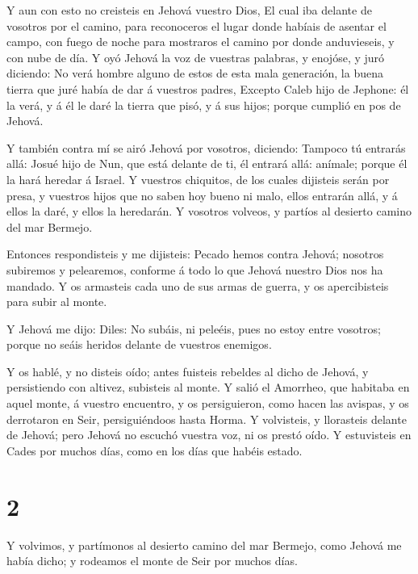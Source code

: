  Y aun con esto no creisteis en Jehová vuestro Dios,
 El cual iba delante de vosotros por el camino, para
reconoceros el lugar donde habíais de asentar el campo, con fuego de
noche para mostraros el camino por donde anduvieseis, y con nube de día.
 Y oyó Jehová la voz de vuestras palabras, y enojóse, y
juró diciendo:  No verá hombre alguno de estos de esta mala
generación, la buena tierra que juré había de dar á vuestros padres,
 Excepto Caleb hijo de Jephone: él la verá, y á él le daré
la tierra que pisó, y á sus hijos; porque cumplió en pos de Jehová.

 Y también contra mí se airó Jehová por vosotros, diciendo:
Tampoco tú entrarás allá:  Josué hijo de Nun, que está
delante de ti, él entrará allá: anímale; porque él la hará heredar á
Israel.  Y vuestros chiquitos, de los cuales dijisteis
serán por presa, y vuestros hijos que no saben hoy bueno ni malo, ellos
entrarán allá, y á ellos la daré, y ellos la heredarán.  Y
vosotros volveos, y partíos al desierto camino del mar Bermejo.

 Entonces respondisteis y me dijisteis: Pecado hemos contra
Jehová; nosotros subiremos y pelearemos, conforme á todo lo que Jehová
nuestro Dios nos ha mandado. Y os armasteis cada uno de sus armas de
guerra, y os apercibisteis para subir al monte.

 Y Jehová me dijo: Diles: No subáis, ni peleéis, pues no
estoy entre vosotros; porque no seáis heridos delante de vuestros
enemigos.

 Y os hablé, y no disteis oído; antes fuisteis rebeldes al
dicho de Jehová, y persistiendo con altivez, subisteis al monte.
 Y salió el Amorrheo, que habitaba en aquel monte, á
vuestro encuentro, y os persiguieron, como hacen las avispas, y os
derrotaron en Seir, persiguiéndoos hasta Horma.  Y
volvisteis, y llorasteis delante de Jehová; pero Jehová no escuchó
vuestra voz, ni os prestó oído.  Y estuvisteis en Cades por
muchos días, como en los días que habéis estado.

\hypertarget{section-1}{%
\section{2}\label{section-1}}

 Y volvimos, y partímonos al desierto camino del mar
Bermejo, como Jehová me había dicho; y rodeamos el monte de Seir por
muchos días.

